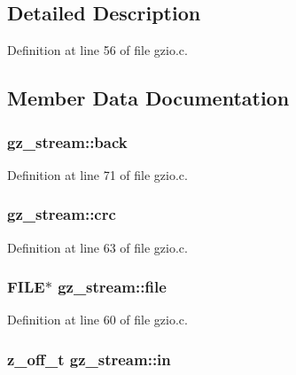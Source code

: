 \subsection{Detailed Description}


Definition at line 56 of file gzio.\-c.



\subsection{Member Data Documentation}
\hypertarget{structgz__stream_a3760ed2b7d4f83931000728a70846766}{
\subsubsection[{back}]{ gz\-\_\-stream\-::back}}\label{structgz__stream_a3760ed2b7d4f83931000728a70846766}


Definition at line 71 of file gzio.\-c.

\hypertarget{structgz__stream_a4d13a01877d20bda538cbf913029e49b}{
\subsubsection[{crc}]{ gz\-\_\-stream\-::crc}}\label{structgz__stream_a4d13a01877d20bda538cbf913029e49b}


Definition at line 63 of file gzio.\-c.

\hypertarget{structgz__stream_a1b41d5983900b66bff148aa6361721db}{
\subsubsection[{file}]{\setlength{\rightskip}{0pt plus 5cm}F\-I\-L\-E$\ast$ gz\-\_\-stream\-::file}}\label{structgz__stream_a1b41d5983900b66bff148aa6361721db}


Definition at line 60 of file gzio.\-c.

\hypertarget{structgz__stream_a4dd2a80eecd5d13f03bb3feddcb12dc1}{
\subsubsection[{in}]{\setlength{\rightskip}{0pt plus 5cm}z\-\_\-off\-\_\-t gz\-\_\-stream\-::in}}\label{structgz__stream_a4dd2a80eecd5d13f03bb3feddcb12dc1}


